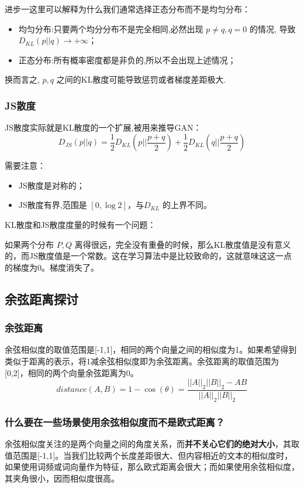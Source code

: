 \documentclass[12pt]{article}
\begin{document}
进步一这里可以解释为什么我们通常选择正态分布而不是均匀分布：
\begin{itemize}
\setlength{\itemsep}{0pt}
\setlength{\parsep}{0pt}
\setlength{\parskip}{0pt}
    \item 均匀分布:只要两个均分分布不是完全相同,必然出现 $p\neq q, q=0$ 的情况, 导致  $D_{KL}(p||q) \rightarrow +\infty$；
    \item 正态分布:所有概率密度都是非负的,所以不会出现上述情况；
\end{itemize}

换而言之, $p,q$ 之间的KL散度可能导致惩罚或者梯度差距极大.

\subsubsection{JS散度}
JS散度实际就是KL散度的一个扩展,被用来推导GAN：
$$
D_{JS} (p||q) = \frac{1}{2} D_{KL}(p||\frac{p+q}{2}) + \frac{1}{2} D_{KL}(q||\frac{p+q}{2})
$$

需要注意：
\begin{itemize}
\setlength{\itemsep}{0pt}
\setlength{\parsep}{0pt}
\setlength{\parskip}{0pt}
    \item JS散度是对称的；
    \item JS散度有界,范围是 $[0, \log 2]$，与$D_{KL}$ 的上界不同。
\end{itemize}

\begin{framed}
KL散度和JS散度度量的时候有一个问题：

如果两个分布 $P,Q$ 离得很远，完全没有重叠的时候，那么KL散度值是没有意义的，而JS散度值是一个常数。这在学习算法中是比较致命的，这就意味这这一点的梯度为0。梯度消失了。
\end{framed}

\subsection{余弦距离探讨\cite{Cosine_Distance}}
\subsubsection{余弦距离}
余弦相似度的取值范围是[-1,1]，相同的两个向量之间的相似度为1。如果希望得到类似于距离的表示，将1减余弦相似度即为余弦距离。余弦距离的取值范围为[0,2]，相同的两个向量余弦距离为0。
$$
distance(A,B) = 1 - \cos(\theta) = \frac{||A||_2||B||_2 - AB}{||A||_2||B||_2}
$$

\subsubsection{什么要在一些场景使用余弦相似度而不是欧式距离？}
余弦相似度关注的是两个向量之间的角度关系，而\textbf{并不关心它们的绝对大小}，其取值范围是[-1,1]。当我们比较两个长度差距很大、但内容相近的文本的相似度时，如果使用词频或词向量作为特征，那么欧式距离会很大；而如果使用余弦相似度，其夹角很小，因而相似度很高。
\end{document}
